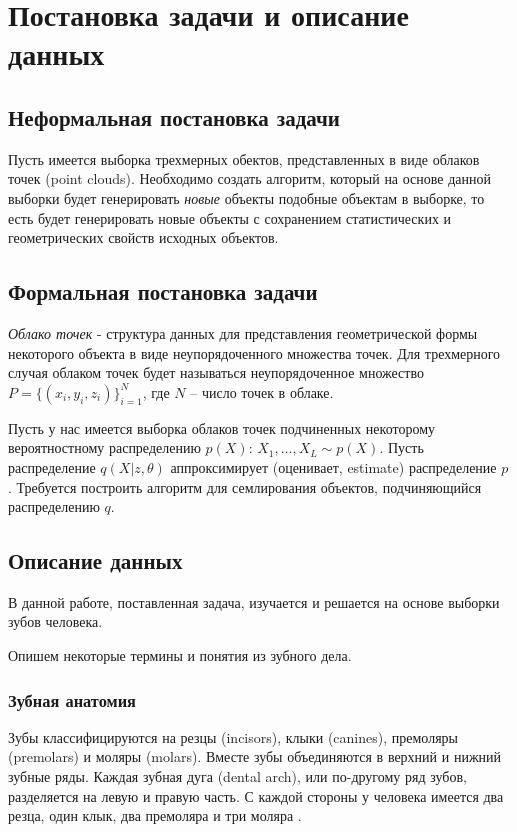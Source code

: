 \section{Постановка задачи и описание данных} \label{section:task}

\subsection{Неформальная постановка задачи}
Пусть имеется выборка трехмерных обектов, представленных в виде облаков точек (point clouds). Необходимо создать алгоритм, который на основе данной выборки будет генерировать \textit{новые} объекты подобные объектам в выборке, то есть будет генерировать новые объекты с сохранением статистических и геометрических свойств исходных объектов.

\subsection{Формальная постановка задачи}


\textit{Облако точек} - структура данных для представления геометрической формы некоторого объекта в виде неупорядоченного множества точек. Для трехмерного случая облаком точек будет называться неупорядоченное множество 
$P = \{(x_{i}, y_{i}, z_{i})\}_{i=1}^{N}$, где $N$ -- число точек в облаке.

Пусть у нас имеется выборка облаков точек подчиненных некоторому вероятностному распределению $p(X)$: $X_{1}, \ldots, X_{L} \sim p(X)$. Пусть распределение $q(X|z, \theta)$ аппроксимирует (оценивает, estimate) распределение $p$. Требуется построить алгоритм для семлирования объектов, подчиняющийся распределению $q$.

\subsection{Описание данных}

В данной работе, поставленная задача, изучается и решается на основе выборки зубов человека.

Опишем некоторые термины и понятия из зубного дела.

\subsubsection{Зубная анатомия}

Зубы классифицируются на резцы (incisors), клыки (canines), премоляры (premolars) и моляры (molars). Вместе зубы объединяются в верхний и нижний зубные ряды. Каждая зубная дуга (dental arch), или по-другому ряд зубов, разделяется на левую и правую часть. С каждой стороны у человека имеется два резца, один клык, два премоляра и три моляра \cite{kumar}.

